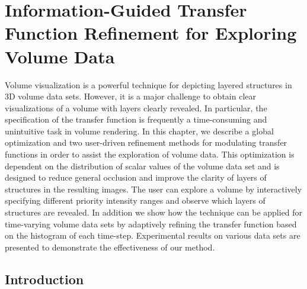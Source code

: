 \chapter{Information-Guided Transfer Function Refinement for Exploring Volume Data \label{transfer_function_refinement}}
Volume visualization is a powerful technique for depicting layered structures in 3D volume data sets. However, it is a major challenge to obtain clear visualizations of a volume with layers clearly revealed.
In particular, the specification of the transfer function is frequently a time-consuming and unintuitive task in volume rendering.
In this chapter, we describe a global optimization and two user-driven refinement methods for modulating transfer functions in order to assist the exploration of volume data.
This optimization is dependent on the distribution of scalar values of the volume data set and is designed to reduce general occlusion and improve the clarity of layers of structures in the resulting images.
The user can explore a volume by interactively specifying different priority intensity ranges and observe which layers of structures are revealed. In addition we show how the technique can be applied for time-varying volume data sets by adaptively refining the transfer function based on the histogram of each time-step. 
Experimental results on various data sets are presented to demonstrate the effectiveness of our method.

\section{Introduction}

